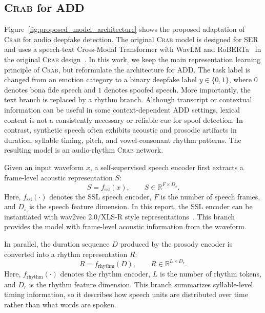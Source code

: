 \documentclass[12pt, a4paper, twocolumn]{article}
\newcommand{\crab}{\textsc{Crab}}
\begin{document}
\subsection{\crab{} for ADD}
Figure~\ref{fig:proposed_model_architecture} shows the proposed adaptation of
\crab{} for audio deepfake detection. The original \crab{} model is designed
for SER and uses a speech-text Cross-Modal Transformer with WavLM and
RoBERTa~\cite{liu2019roberta} in the original \crab{} design~\cite{ueda2026crab}. In this work, we keep the main representation
learning principle of \crab{}, but reformulate the architecture for ADD\@. The
task label is changed from an emotion category to a binary deepfake label
\(y \in \{0,1\}\), where \(0\) denotes bona fide speech and \(1\) denotes spoofed
speech. 
More importantly, the text branch is replaced by a rhythm branch. Although
transcript or contextual information can be useful in some context-dependent ADD
settings, lexical content is not a consistently necessary or reliable cue for
spoof detection. In contrast, synthetic speech often exhibits acoustic and
prosodic artifacts in duration, syllable timing, pitch, and vowel-consonant
rhythm patterns. The resulting model is an audio-rhythm \crab{} network.


Given an input waveform \(x\), a self-supervised speech encoder first extracts
a frame-level acoustic representation \(S\):
\begin{equation}
S = f_{\mathrm{ssl}}(x), \qquad
S \in \mathbb{R}^{F \times D_s}.
\end{equation}
Here, \(f_{\mathrm{ssl}}(\cdot)\) denotes the SSL speech encoder, \(F\) is the
number of speech frames, and \(D_s\) is the speech feature dimension. In this
report, the SSL encoder can be instantiated with wav2vec 2.0/XLS-R style
representations~\cite{baevski2020wav2vec2}. This branch provides the model with
frame-level acoustic information from the waveform.

In parallel, the duration sequence \(D\) produced by the prosody encoder is
converted into a rhythm representation \(R\):
\begin{equation}
R = f_{\mathrm{rhythm}}(D), \qquad
R \in \mathbb{R}^{L \times D_r}.
\end{equation}
Here, \(f_{\mathrm{rhythm}}(\cdot)\) denotes the rhythm encoder, \(L\) is the
number of rhythm tokens, and \(D_r\) is the rhythm feature dimension. This branch
summarizes syllable-level timing information, so it describes how speech units
are distributed over time rather than what words are spoken.
\end{document}
